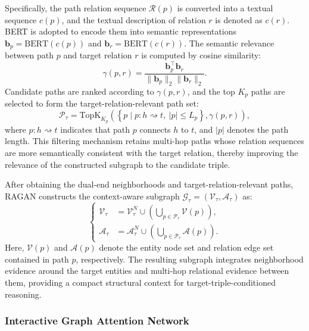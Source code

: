 \documentclass[pdflatex,sn-mathphys-num]{sn-jnl}
\begin{document}
Specifically, the path relation sequence $\mathcal{R}(p)$ is converted into a textual sequence $c(p)$, and the textual description of relation $r$ is denoted as $c(r)$. BERT is adopted to encode them into semantic representations $\mathbf{b}_{p}=\mathrm{BERT}(c(p))$ and $\mathbf{b}_{r}=\mathrm{BERT}(c(r))$. The semantic relevance between path $p$ and target relation $r$ is computed by cosine similarity:
\begin{equation}
\gamma(p,r)
=
\frac{
\mathbf{b}_{p}^{\top}\mathbf{b}_{r}
}{
\|\mathbf{b}_{p}\|_{2}\|\mathbf{b}_{r}\|_{2}
}.
\end{equation}
Candidate paths are ranked according to $\gamma(p,r)$, and the top $K_p$ paths are selected to form the target-relation-relevant path set:
\begin{equation}
\mathcal{P}_{\tau}
=
\mathrm{TopK}_{K_p}
\left(
\left\{
p
\mid
p:h\rightsquigarrow t,\ |p|\leq L_p
\right\},
\gamma(p,r)
\right),
\end{equation}
where $p:h\rightsquigarrow t$ indicates that path $p$ connects $h$ to $t$, and $|p|$ denotes the path length. This filtering mechanism retains multi-hop paths whose relation sequences are more semantically consistent with the target relation, thereby improving the relevance of the constructed subgraph to the candidate triple.

After obtaining the dual-end neighborhoods and target-relation-relevant paths, RAGAN constructs the context-aware subgraph $\mathcal{G}_{\tau}=(\mathcal{V}_{\tau},\mathcal{A}_{\tau})$ as:
\begin{equation}
\left\{
\begin{aligned}
\mathcal{V}_{\tau}
&=
\mathcal{V}_{\tau}^{N}
\cup
\left(
\bigcup_{p\in\mathcal{P}_{\tau}}
\mathcal{V}(p)
\right), \\
\mathcal{A}_{\tau}
&=
\mathcal{A}_{\tau}^{N}
\cup
\left(
\bigcup_{p\in\mathcal{P}_{\tau}}
\mathcal{A}(p)
\right).
\end{aligned}
\right.
\end{equation}
Here, $\mathcal{V}(p)$ and $\mathcal{A}(p)$ denote the entity node set and relation edge set contained in path $p$, respectively. The resulting subgraph integrates neighborhood evidence around the target entities and multi-hop relational evidence between them, providing a compact structural context for target-triple-conditioned reasoning.

\subsubsection{Interactive Graph Attention Network}
\end{document}
